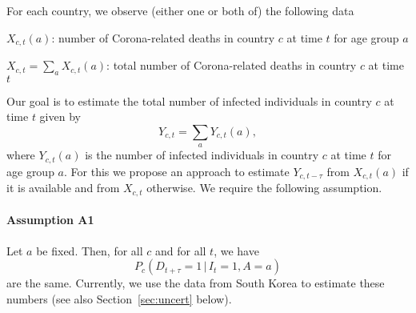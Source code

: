 \documentclass[a4paper]{article}
\renewcommand\P{\mathbb{P}}
\newcommand{\given}{\, \vert \,}
\begin{document}
For each country, we observe (either one or both of) the following data
\begin{compactitem}
\item $X_{c,t}(a)$: number of Corona-related deaths in country $c$ at
  time $t$ for age group $a$
\item $X_{c,t} = \sum_a X_{c,t}(a)$: total number of Corona-related
  deaths in country $c$ at time $t$
\end{compactitem}
Our goal is to estimate the total number of infected
individuals in country $c$ at time $t$ given by
$$Y_{c,t} = \sum_a Y_{c,t}(a),$$ where $Y_{c,t}(a)$ is the number of
infected individuals in country $c$ at time $t$ for age group $a$.
For this we propose an approach to estimate $Y_{c,t-\tau}$ from
$X_{c,t}(a)$ if it is available and from $X_{c,t}$ otherwise. We require the following assumption.


\paragraph{Assumption A1} Let $a$ be fixed. Then, for all $c$ and for
all $t$, we have
\begin{equation}
P_c(D_{t+\tau} = 1\,|\,I_t = 1, A = a)
\end{equation}
are the same. 
Currently, we use the data from South Korea to 
estimate these numbers (see also Section~\ref{sec:uncert} below). 

\end{document}
